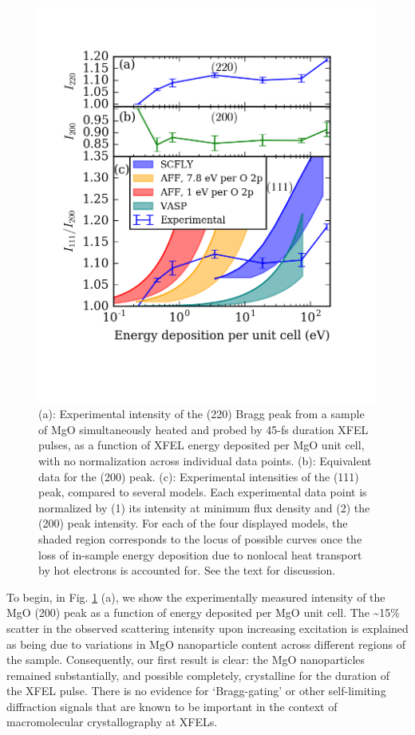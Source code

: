 \begin{figure}[h] \label{cm2image1}
\caption{
(a): Experimental intensity of the (220) Bragg peak
from a sample of MgO simultaneously heated and probed by 45-fs duration
XFEL pulses, as a function of XFEL energy deposited per MgO unit cell,
with no normalization across individual data points. (b): Equivalent
data for the (200) peak. (c): Experimental intensities of the (111)
peak, compared to several models. Each experimental data point is
normalized by (1) its intensity at minimum flux density and (2) the
(200) peak intensity. For each of the four displayed models, the shaded
region corresponds to the locus of possible curves once the loss of
in-sample energy deposition due to nonlocal heat transport by hot
electrons is accounted for. See the text for discussion.
}
\centering
\includegraphics{MgO_2.7.docx1503027860/media/image1.png}
\end{figure}

To begin, in Fig. \ref{cm2image1} (a), we show the experimentally measured intensity
of the MgO (200) peak as a function of energy deposited per MgO unit
cell. The \textasciitilde{}15\% scatter in the observed scattering
intensity upon increasing excitation is explained as being due to
variations in MgO nanoparticle content across different regions of the
sample. Consequently, our first result is clear: the MgO nanoparticles
remained substantially, and possible completely, crystalline for the
duration of the XFEL pulse. There is no evidence for `Bragg-gating' or
other self-limiting diffraction signals that are known to be important
in the context of macromolecular crystallography at XFELs. \cite{caleman2015ultrafast}


